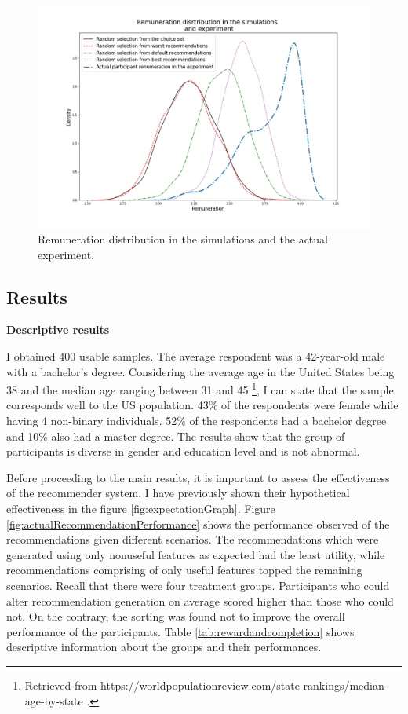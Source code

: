 \documentclass[a4paper,12pt]{article}
\begin{document}
\begin{figure}
    \centering
    \includegraphics[width=0.99\linewidth]{staticFiles/AverageRemunerationWorstToBest.png}
    \caption[Remuneration distribution]{Remuneration distribution in the simulations and the actual experiment.}
    \label{fig:averageRemuneration}
\end{figure}




\subsection{Results}

\textbf{Descriptive results}

I obtained 400 usable samples. The average respondent was a 42-year-old male with a bachelor's degree. Considering the average age in the United States being 38 and the median age ranging between 31 and 45 \footnote{Retrieved from https://worldpopulationreview.com/state-rankings/median-age-by-state .}, I can state that the sample corresponds well to the US population. 43\% of the respondents were female while having 4 non-binary individuals. 52\% of the respondents had a bachelor degree and 10\% also had a master degree. The results show that the group of participants is diverse in gender and education level and is not abnormal.

Before proceeding to the main results, it is important to assess the effectiveness of the recommender system. I have previously shown their hypothetical effectiveness in the figure \ref{fig:expectationGraph}. Figure \ref{fig:actualRecommendationPerformance} shows the performance observed of the recommendations given different scenarios. The recommendations which were generated using only nonuseful features as expected had the least utility, while recommendations comprising of only useful features topped the remaining scenarios. Recall that there were four treatment groups. Participants who could alter recommendation generation on average scored higher than those who could not. On the contrary, the sorting was found not to improve the overall performance of the participants. Table \ref{tab:rewardandcompletion} shows descriptive information about the groups and their performances.
\end{document}
